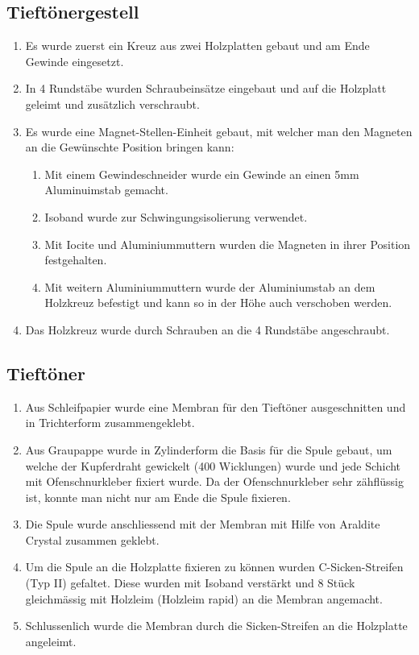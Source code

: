 \documentclass[a4paper,11pt]{report}
\begin{document}
\newpage
\subsection{Tieftönergestell}
\begin{enumerate}
    \item Es wurde zuerst ein Kreuz aus zwei Holzplatten gebaut und am Ende Gewinde eingesetzt.
    \item In 4 Rundstäbe wurden Schraubeinsätze eingebaut und auf die Holzplatt geleimt und zusätzlich verschraubt.
    \item Es wurde eine Magnet-Stellen-Einheit gebaut, mit welcher man den Magneten an die Gewünschte Position bringen kann:
    \begin{enumerate}
        \item Mit einem Gewindeschneider wurde ein Gewinde an einen 5mm Aluminuimstab gemacht.
        \item Isoband wurde zur Schwingungsisolierung verwendet.
        \item Mit Iocite und Aluminiummuttern wurden die Magneten in ihrer Position festgehalten.
        \item Mit weitern Aluminiummuttern wurde der Aluminiumstab an dem Holzkreuz befestigt und kann so in der Höhe auch verschoben werden.
    \end{enumerate}
    \item Das Holzkreuz wurde durch Schrauben an die 4 Rundstäbe angeschraubt.
\end{enumerate}
\subsection{Tieftöner}
\begin{enumerate}
    \item Aus Schleifpapier wurde eine Membran für den Tieftöner ausgeschnitten und in Trichterform zusammengeklebt.
    \item Aus Graupappe wurde in Zylinderform die Basis für die Spule gebaut, um welche der Kupferdraht gewickelt (400 Wicklungen) wurde und jede Schicht mit Ofenschnurkleber fixiert wurde. Da der Ofenschnurkleber sehr zähflüssig ist, konnte man nicht nur am Ende die Spule fixieren.
    \item Die Spule wurde anschliessend mit der Membran mit Hilfe von Araldite Crystal zusammen geklebt.
    \item Um die Spule an die Holzplatte fixieren zu können wurden C-Sicken-Streifen (Typ II) gefaltet. Diese wurden mit Isoband verstärkt und 8 Stück gleichmässig mit Holzleim (Holzleim rapid) an die Membran angemacht.
    \item Schlussenlich wurde die Membran durch die Sicken-Streifen an die Holzplatte angeleimt.
\end{enumerate}
\end{document}
